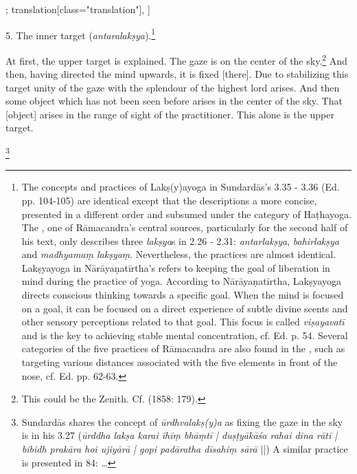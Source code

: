 \begin{alignment}[
  texts=edition[class="edition"];
  translation[class="translation"],
  ]
\begin{translation}
\begin{tlate}[p13_01]
   5. The inner target (\textit{antaralakṣya}).\footnote{The concepts and practices of Lakṣ(y)ayoga in Sundardās's  3.35 - 3.36 (Ed. pp. 104-105) are identical except that the descriptions a more concise, presented in a different order and subsumed under the category of Haṭhayoga. The , one of Rāmacandra's central sources, particularly for the second half of his text, only describes three \textit{lakṣya}s in 2.26 - 2.31: \textit{antarlakṣya}, \textit{bahirlakṣya} and \textit{madhyamaṃ lakṣyaṃ}. Nevertheless, the practices are almost identical. Lakṣyayoga in Nārāyaṇatīrtha's  refers to keeping the goal of liberation in mind during the practice of yoga. According to Nārāyaṇatīrtha, Lakṣyayoga directs conscious thinking towards a specific goal. When the mind is focused on a goal, it can be focused on a direct experience of subtle divine scents and other sensory perceptions related to that goal. This focus is called \textit{viṣayavatī} and is the key to achieving stable mental concentration, cf. Ed. p. 54. Several categories of the five practices of Rāmacandra are also found in the , such as targeting various distances associated with the five elements in front of the nose, cf. Ed. pp. 62-63.}
 \end{tlate}
     \label{urdhvalaksyatrans} 
  \begin{tlate}[p14_01]
    At first, the upper target is explained. The gaze is on the center of the sky.\footnote{This could be the Zenith. Cf.  (1858: 179).} And then, having directed the mind upwards, it is fixed [there]. Due to stabilizing this target unity of the gaze with the splendour of the highest lord arises. And then some object which has not been seen before arises in the center of the sky. That [object] arises in the range of sight of the practitioner. This alone is the upper target.\begin{buber}[f14_1]\footnote{Sundardās shares the concept of \textit{ūrdhvalakṣ(y)a} as fixing the gaze in the sky is in his  3.27 (\textit{ūrddha lakṣa karai ihīṃ bhāṃtī | duṣṭyākāśa rahai dina rātī | bibidh prakāra hoi ujiyārā | gopi padāratha dīsahiṃ sārā} ||) A similar practice is presented in  84: \ldots}\end{buber}
    \flushpage 
  \end{tlate}
  \end{translation}
\end{alignment}
